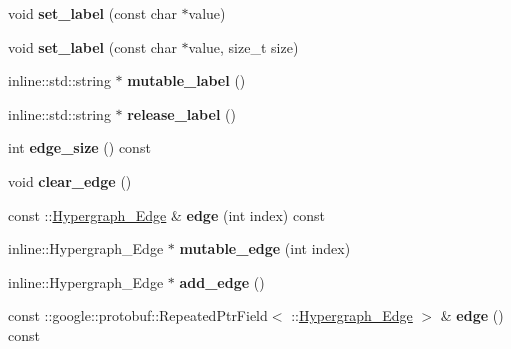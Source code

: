\begin{DoxyCompactItemize}
\item 
\hypertarget{classHypergraph__Node_a7b48964a1cf2a5d8964873751733b217}{
void {\bfseries set\_\-label} (const char $\ast$value)}
\label{classHypergraph__Node_a7b48964a1cf2a5d8964873751733b217}

\item 
\hypertarget{classHypergraph__Node_a9838f053ff36a98ce5050537c5c5ff1b}{
void {\bfseries set\_\-label} (const char $\ast$value, size\_\-t size)}
\label{classHypergraph__Node_a9838f053ff36a98ce5050537c5c5ff1b}

\item 
\hypertarget{classHypergraph__Node_a0b775852c7e02969bc6b738a16651a1d}{
inline::std::string $\ast$ {\bfseries mutable\_\-label} ()}
\label{classHypergraph__Node_a0b775852c7e02969bc6b738a16651a1d}

\item 
\hypertarget{classHypergraph__Node_a583e023c7c478a1cab101fed2489c1ca}{
inline::std::string $\ast$ {\bfseries release\_\-label} ()}
\label{classHypergraph__Node_a583e023c7c478a1cab101fed2489c1ca}

\item 
\hypertarget{classHypergraph__Node_a444e336785528842df37d3279b61e646}{
int {\bfseries edge\_\-size} () const }
\label{classHypergraph__Node_a444e336785528842df37d3279b61e646}

\item 
\hypertarget{classHypergraph__Node_a8148d16453c80519f253274f3a6a5cd1}{
void {\bfseries clear\_\-edge} ()}
\label{classHypergraph__Node_a8148d16453c80519f253274f3a6a5cd1}

\item 
\hypertarget{classHypergraph__Node_aacc6c349a490d2d7c6c5ce9e23dac2d7}{
const ::\hyperlink{classHypergraph__Edge}{Hypergraph\_\-Edge} \& {\bfseries edge} (int index) const }
\label{classHypergraph__Node_aacc6c349a490d2d7c6c5ce9e23dac2d7}

\item 
\hypertarget{classHypergraph__Node_ab246b20946afc1d6f06b10dfd24e32f1}{
inline::Hypergraph\_\-Edge $\ast$ {\bfseries mutable\_\-edge} (int index)}
\label{classHypergraph__Node_ab246b20946afc1d6f06b10dfd24e32f1}

\item 
\hypertarget{classHypergraph__Node_a5ef0cdc2d70ca1da672a6301641b5452}{
inline::Hypergraph\_\-Edge $\ast$ {\bfseries add\_\-edge} ()}
\label{classHypergraph__Node_a5ef0cdc2d70ca1da672a6301641b5452}

\item 
\hypertarget{classHypergraph__Node_a9b9a2557260be3ff3b47f04d8777ed80}{
const ::google::protobuf::RepeatedPtrField$<$ ::\hyperlink{classHypergraph__Edge}{Hypergraph\_\-Edge} $>$ \& {\bfseries edge} () const }
\label{classHypergraph__Node_a9b9a2557260be3ff3b47f04d8777ed80}


\end{DoxyCompactItemize}
